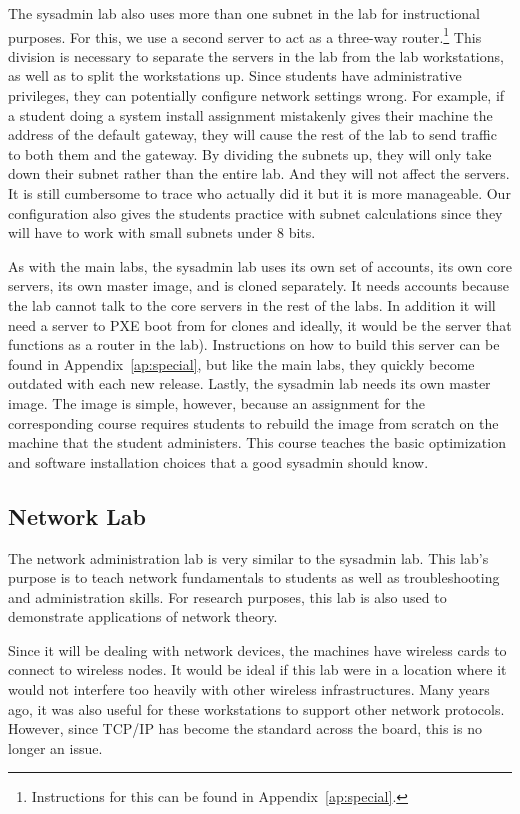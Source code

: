 The sysadmin lab also uses more than one subnet in the lab for instructional purposes.  For this, we use a second server to act as a three-way router.\footnote{Instructions for this can be found in Appendix~\ref{ap:special}.}  This division is necessary to separate the servers in the lab from the lab workstations, as well as to split the workstations up.  Since students have administrative privileges, they can potentially configure network settings wrong.  For example, if a student doing a system install assignment mistakenly gives their machine the address of the default gateway, they will cause the rest of the lab to send traffic to both them and the gateway.  By dividing the subnets up, they will only take down their subnet rather than the entire lab.  And they will not affect the servers.  It is still cumbersome to trace who actually did it but it is more manageable.  Our configuration also gives the students practice with subnet calculations since they will have to work with small subnets under 8 bits.

As with the main labs, the sysadmin lab uses its own set of accounts, its own core servers, its own master image, and is cloned separately.  It needs accounts because the lab cannot talk to the core servers in the rest of the labs.  In addition it will need a server to PXE boot from for clones and ideally, it would be the server that functions as a router in the lab).  Instructions on how to build this server can be found in Appendix~\ref{ap:special}, but like the main labs, they quickly become outdated with each new release.  Lastly, the sysadmin lab needs its own master image.  The image is simple, however, because an assignment for the corresponding course requires students to rebuild the image from scratch on the machine that the student administers.  This course teaches the basic optimization and software installation choices that a good sysadmin should know.  

\subsection{Network Lab}
The network administration lab is very similar to the sysadmin lab.  This lab's purpose is to teach network fundamentals to students as well as troubleshooting and administration skills.  For research purposes, this lab is also used to demonstrate applications of network theory.  

Since it will be dealing with network devices, the machines have wireless cards to connect to wireless nodes.  It would be ideal if this lab were in a location where it would not interfere too heavily with other wireless infrastructures.  Many years ago, it was also useful for these workstations to support other network protocols.  However, since TCP/IP has become the standard across the board, this is no longer an issue.  

